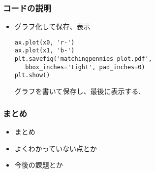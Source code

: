 \documentclass[dvipdfmx,fleqn]{beamer}
\begin{document}
\begin{frame}[containsverbatim]%
\frametitle{コードの説明}
\begin{itemize}\setlength{\parskip}{0.5em}

\item
グラフ化して保存、表示

\begin{verbatim}
ax.plot(x0, 'r-')
ax.plot(x1, 'b-')
plt.savefig('matchingpennies_plot.pdf', 
   bbox_inches='tight', pad_inches=0)
plt.show()
\end{verbatim}

グラフを書いて保存し、最後に表示する.

\end{itemize}
\end{frame}







\begin{frame}
\frametitle{まとめ}
\begin{itemize}\setlength{\parskip}{0.5em}
\item
まとめ

\item
よくわかっていない点とか

\item
今後の課題とか
\end{itemize}
\end{frame}
\end{document}

